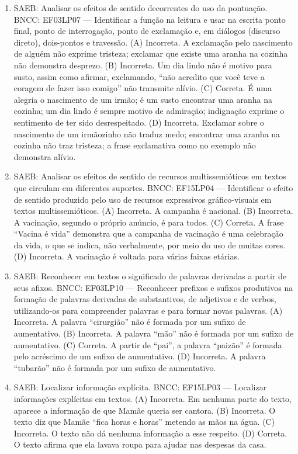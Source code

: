\begin{enumerate}
\item
SAEB: Analisar os efeitos de sentido decorrentes do uso da pontuação. 
BNCC: EF03LP07 --- Identificar a função na leitura e usar na escrita ponto final, ponto de interrogação, ponto de exclamação e, em diálogos (discurso direto), dois-pontos e travessão. 
(A) Incorreta. A exclamação pelo nascimento de alguém não exprime tristeza; exclamar que existe uma aranha na cozinha não demonstra desprezo. 
(B) Incorreta. Um dia lindo não é motivo para susto, assim como afirmar, exclamando, ``não acredito que você teve a coragem de fazer isso comigo'' não transmite alívio. 
(C) Correta. É uma alegria o nascimento de um irmão; é um susto encontrar uma aranha na cozinha; um dia lindo é sempre motivo de admiração; indignação exprime o sentimento de ter sido desrespeitado. 
(D) Incorreta. Exclamar sobre o nascimento de um irmãozinho não traduz medo; encontrar uma aranha na cozinha não traz tristeza; a frase exclamativa como no exemplo não demonstra alívio.

\item
SAEB: Analisar os efeitos de sentido de recursos multissemióticos em textos que circulam em diferentes suportes. 
BNCC: EF15LP04 --- Identificar o efeito de sentido produzido pelo uso de recursos expressivos gráfico-visuais em textos multissemióticos. 
(A) Incorreta. A campanha é nacional. 
(B) Incorreta. A vacinação, segundo o próprio anúncio, é para todos. 
(C) Correta. A frase ``Vacina é vida'' demonstra que a campanha de vacinação é uma celebração da vida, o que se indica, não verbalmente, por meio do uso de muitas cores. 
(D) Incorreta. A vacinação é voltada para várias faixas etárias.

\item
SAEB: Reconhecer em textos o significado de palavras derivadas a partir de seus afixos. 
BNCC: EF03LP10 --- Reconhecer prefixos e sufixos produtivos na formação de palavras derivadas de substantivos, de adjetivos e de verbos, utilizando-os para compreender palavras e para formar novas palavras. 
(A) Incorreta. A palavra ``cirurgião'' não é formada por um sufixo de aumentativo. 
(B) Incorreta. A palavra ``mão'' não é formada por um sufixo de aumentativo. 
(C) Correta. A partir de ``pai'', a palavra ``paizão'' é formada pelo acréscimo de um sufixo de aumentativo. 
(D) Incorreta. A palavra ``tubarão'' não é formada por um sufixo de aumentativo.

\item
SAEB: Localizar informação explícita. 
BNCC: EF15LP03 --- Localizar informações explícitas em textos. 
(A) Incorreta. Em nenhuma parte do texto, aparece a informação de que Mamãe queria ser cantora.
(B) Incorreta. O texto diz que Mamãe ``fica horas e horas'' metendo as mãos na água. 
(C) Incorreta. O texto não dá nenhuma informação a esse respeito. 
(D) Correta. O texto afirma que ela lavava roupa para ajudar nas despesas da casa.


\end{enumerate}
